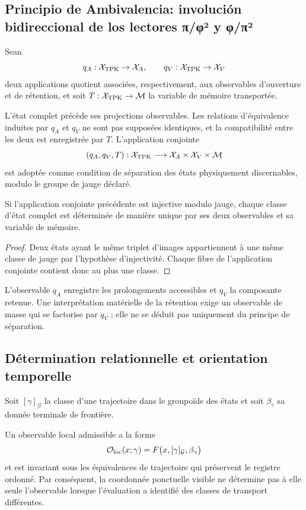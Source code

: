 \subsection{Principio de Ambivalencia: involución bidireccional de los lectores π/φ² y φ/π²}

Sean
\[
 q_A:\mathcal X_{\rm TPK}\to\mathcal X_A,
 \qquad
 q_V:\mathcal X_{\rm TPK}\to\mathcal X_V
\]
deux applications quotient associées, respectivement, aux observables
d'ouverture et de rétention, et soit
\(T:\mathcal X_{\rm TPK}\to\mathcal M\) la variable de mémoire
transportée.

\begin{principle}[Ambivalence]
L'état complet précède ses projections observables. Les relations
d'équivalence induites par \(q_A\) et \(q_V\) ne sont pas supposées identiques, et la
compatibilité entre les deux est enregistrée par \(T\). L'application conjointe
\[
 (q_A,q_V,T):\mathcal X_{\rm TPK}
 \longrightarrow\mathcal X_A\times\mathcal X_V\times\mathcal M
\]
est adoptée comme condition de séparation des états physiquement
discernables, modulo le groupe de jauge déclaré.
\end{principle}

\begin{proposition}
Si l'application conjointe précédente est injective modulo jauge, chaque classe
d'état complet est déterminée de manière unique par ses deux observables et sa
variable de mémoire.
\end{proposition}
\begin{proof}
Deux états ayant le même triplet d'images appartiennent à une même classe de
jauge par l'hypothèse d'injectivité. Chaque fibre de l'application conjointe
contient donc au plus une classe.
\end{proof}

L'observable \(q_A\) enregistre les prolongements accessibles et \(q_V\) la
composante retenue. Une interprétation matérielle de la rétention exige un
observable de masse qui se factorise par \(q_V\) ; elle ne se déduit pas uniquement du
principe de séparation.

\subsection{Détermination relationnelle et orientation temporelle}

Soit \([\gamma]_{\mathcal G}\) la classe d'une trajectoire dans le groupoïde des
états et soit \(\beta_\gamma\) sa donnée terminale de frontière.
\begin{principle}
Un observable local admissible a la forme
\[
 \mathcal O_{\rm loc}(x;\gamma)
 =F\bigl(x,[\gamma]_{\mathcal G},\beta_\gamma\bigr)
\]
et est invariant sous les équivalences de trajectoire qui préservent le
registre ordonné. Par conséquent, la coordonnée ponctuelle visible ne détermine pas
à elle seule l'observable lorsque l'évaluation a identifié des classes de
transport différentes.
\end{principle}


